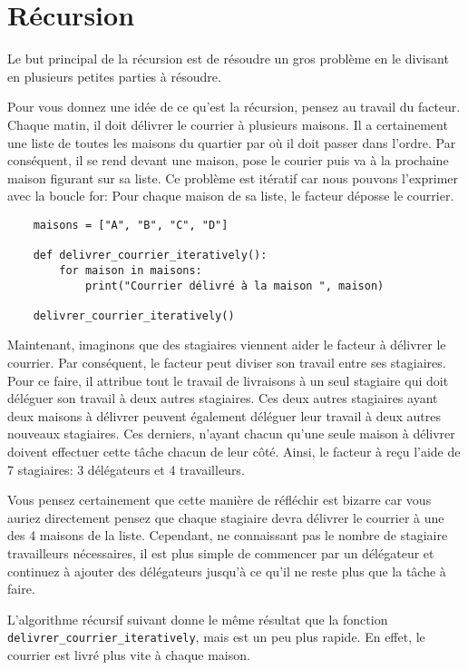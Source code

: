 \section{Récursion}

Le but principal de la récursion est de résoudre un gros problème en le divisant en plusieurs petites parties à résoudre.

Pour vous donnez une idée de ce qu'est la récursion, pensez au travail du facteur. Chaque matin, il doit délivrer le courrier à plusieurs maisons. Il a certainement une liste de toutes les maisons du quartier par où il doit passer dans l'ordre. Par conséquent, il se rend devant une maison, pose le courier puis va à la prochaine maison figurant sur sa liste. Ce problème est itératif car nous pouvons l'exprimer avec la boucle for: Pour chaque maison de sa liste, le facteur déposse le courrier. 

\begin{verbatim}
    maisons = ["A", "B", "C", "D"]

    def delivrer_courrier_iteratively():
        for maison in maisons:
            print("Courrier délivré à la maison ", maison)
            
    delivrer_courrier_iteratively()
\end{verbatim}

Maintenant, imaginons que des stagiaires viennent aider le facteur à délivrer le courrier. Par conséquent, le facteur peut diviser son travail entre ses stagiaires. Pour ce faire, il attribue tout le travail de livraisons à un seul stagiaire qui doit déléguer son travail à deux autres stagiaires. Ces deux autres stagiaires ayant deux maisons à délivrer peuvent également déléguer leur travail à deux autres nouveaux stagiaires. Ces derniers, n'ayant chacun qu'une seule maison à délivrer doivent effectuer cette tâche chacun de leur côté. Ainsi, le facteur à reçu l'aide de 7 stagiaires: 3 délégateurs et 4 travailleurs. 

Vous pensez certainement que cette manière de réfléchir est bizarre car vous auriez directement pensez que chaque stagiaire devra délivrer le courrier à une des 4 maisons de la liste. Cependant, ne connaissant pas le nombre de stagiaire travailleurs nécessaires, il est plus simple de commencer par un délégateur et continuez à ajouter des délégateurs jusqu'à ce qu'il ne reste plus que la tâche à faire. 

L'algorithme récursif suivant donne le même résultat que la fonction \lstinline{delivrer_courrier_iteratively}, mais est un peu plus rapide. En effet, le courrier est livré plus vite à chaque maison. 


